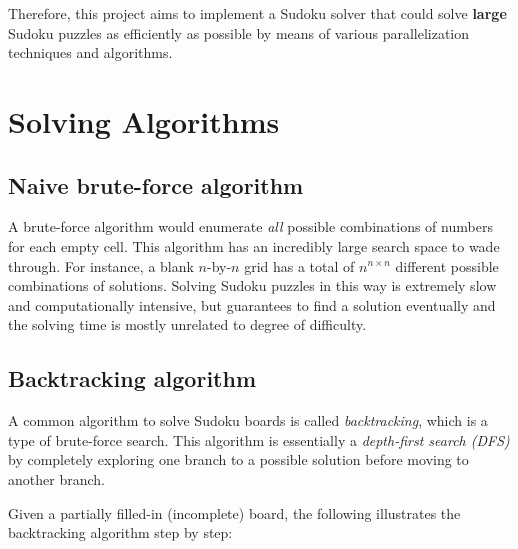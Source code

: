 \documentclass[12pt,a4paper]{article}
\begin{document}
Therefore, this project aims to implement a Sudoku solver that could solve \textbf{large} Sudoku puzzles
as efficiently as possible by means of various parallelization techniques and algorithms.


\newpage %
\section{Solving Algorithms} \label{sec:solving-algorithms}
	\cite{wiki:Sudoku-solving-algorithms}

	\subsection{Naive brute-force algorithm} \label{sec:brute-force-algorithms}
	A brute-force algorithm would enumerate \textit{all} possible combinations of numbers for each empty cell.
	This algorithm has an incredibly large search space to wade through.
	For instance, a blank $n$-by-$n$ grid has a total of $n^{n \times n}$ different possible combinations of solutions.
	Solving Sudoku puzzles in this way is extremely slow and computationally intensive,
	but guarantees to find a solution eventually and the solving time is mostly unrelated to degree of difficulty.

	\subsection{Backtracking algorithm}
	A common algorithm to solve Sudoku boards is called \textit{backtracking},
	which is a type of brute-force search.
	This algorithm is essentially a \textit{depth-first search (DFS)} by completely exploring one
	branch to a possible solution before moving to another branch.
	
	Given a partially filled-in (incomplete) board, the following illustrates the backtracking algorithm
	step by step: \cite{techwithtim:backtracking}
\end{document}
